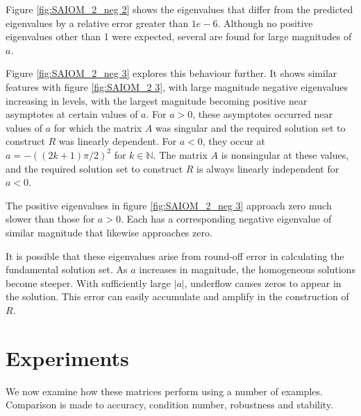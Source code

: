 \documentclass{sfuthesis}
\begin{document}
Figure \ref{fig:SAIOM_2_neg 2} shows the eigenvalues that differ from the predicted eigenvalues by a relative error greater than $1e-6$.
Although no positive eigenvalues other than 1 were expected, several are found for large magnitudes of $a$.

Figure \ref{fig:SAIOM_2_neg 3} explores this behaviour further.
It shows similar features with figure \ref{fig:SAIOM_2 3}, with large magnitude negative eigenvalues increasing in levels, with the largest magnitude becoming positive near asymptotes at certain values of $a$.
For $a>0$, these asymptotes occurred near values of $a$ for which the matrix $A$ was singular and the required solution set to construct $R$ was linearly dependent.
For $a<0$, they occur at $a = -( (2k+1) \pi/2)^2$ for $k \in \mathbb{N}$.
The matrix $A$ is nonsingular at these values, and the required solution set to construct $R$ is always linearly independent for $a<0$.

The positive eigenvalues in figure \ref{fig:SAIOM_2_neg 3} approach zero much slower than those for $a>0$.
Each has a corresponding negative eigenvalue of similar magnitude that likewise approaches zero.

It is possible that these eigenvalues arise from round-off error in calculating the fundamental solution set.
As $a$ increases in magnitude, the homogeneous solutions become steeper.
With sufficiently large $|a|$, underflow causes zeros to appear in the solution.
This error can easily accumulate and amplify in the construction of $R$.



\chapter{Experiments}

We now examine how these matrices perform using a number of examples.
Comparison is made to accuracy, condition number, robustness and stability.

\label{ch:Examples}
\end{document}
